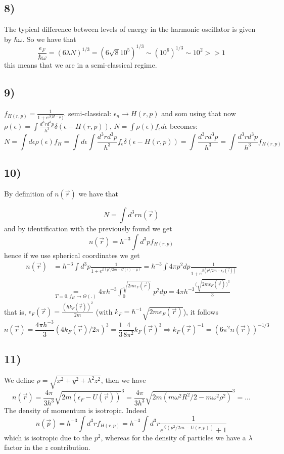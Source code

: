 \documentclass[10pt,a4paper]{book}
\begin{document}
\subsection*{8)}
The typical difference between levels of energy in the harmonic oscillator is given by $\hbar \omega$. So we have that
$$ \frac{\epsilon_F}{\hbar\omega}=(6\lambda N)^{1/3}=(6\sqrt{8} 10^5)^{1/3}\sim (10^6)^{1/3}\sim 10^2>>1$$ this means that we are in a semi-classical regime. 

\subsection*{9)}
$f_{H(r,p)}=\frac{1}{1+e^{\beta( H-\mu})}$. semi-classical: $\epsilon_n\to H(r,p)$ and som using that now $\rho(\epsilon)=\int\frac{d^3rd^3p}{h^3}\delta(\epsilon-H(r,p))$, $N=\int\rho(\epsilon)f_{\epsilon}d\epsilon$  becomes:
$$N=\int d\epsilon\rho(\epsilon)f_H=\int d\epsilon\int\frac{d^3rd^3p}{h^3}f_{\epsilon}\delta(\epsilon-H(r,p))=\int\frac{d^3rd^3p}{h^3}=\int\frac{d^3rd^3p}{h^3}f_{H(r,p)}$$


\subsection*{10)}
By definition of $n(\vec{r})$ we have that

$$N=\int d^3r n(\vec{r})$$
and by identification with the previously found we get 
$$n(\vec{r})=h^{-3}\int d^3pf_{H(r,p)}$$
hence if we use spherical coordinates we get 
\begin{align*}
n(\vec{r})&=h^{-3}\int d^3p\frac{1}{1+e^{\beta(p^2/2m+U(r)-\mu)}}=\hbar^{-3}\int 4\pi p^2dp\frac{1}{1+e^{\beta(p^2/2m-\epsilon_F(\vec{r}))}}
\\
&\underset{T=0,f_H\to\Theta(.)}{=}4\pi h^{-3}\int_0^{\sqrt{2m\epsilon_F(\vec{r})}}p^2 dp=4\pi h^{-3}\frac{\big(\sqrt{2m\epsilon_F(\vec{r})}\big)^3}{3}
\end{align*} that is, $\epsilon_F(\vec{r})=\frac{(\hbar k_F(\vec{r}))^2}{2m}$ (with $k_F=\hbar^{-1}\sqrt{2m\epsilon_F(\vec{r})}$), it follows 
$$n(\vec{r})=\frac{4\pi h^{-3}}{3}(4k_F(\vec{r})/2\pi)^3=\frac{1}{3}\frac{4}{8\pi^2}k_F(\vec{r})^3\Rightarrow k_F(\vec{r})^{-1}=(6\pi^2 n(\vec{r}))^{-1/3}$$


\subsection*{11)}
We define $\rho=\sqrt{x^2+y^2+\lambda^2 z^2}$, then we have
$$n(\vec{r})=\frac{4\pi}{3h^3}\sqrt{2m(\epsilon_F-U(\vec{r}))}^3=\frac{4\pi}{3h^3}\sqrt{2m(m\omega^2 R^2/2-m\omega^2\rho^2)}^3=...$$
The density of momentum is isotropic. Indeed
$$n(\vec{p})=h^{-3}\int d^3rf_{H(r,p)}=h^{-3}\int d^3r\frac{1}{e^{\beta(p^2/2m-U(r,p))}+1}$$ which is isotropic due to the $p^2$, whereas for the density of particles we have a $\lambda$ factor in the $z$ contribution.
\end{document}
